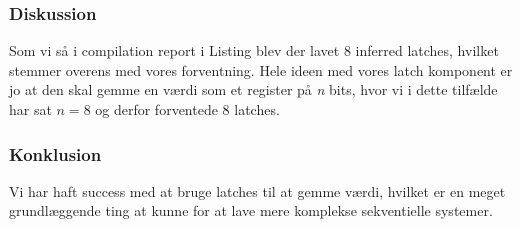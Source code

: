 {    %
    \subsubsection{Diskussion}

    Som vi så i compilation report i Listing  blev der lavet 8 inferred latches, hvilket stemmer overens med vores forventning. Hele ideen med vores latch komponent er jo at den skal gemme en værdi som et register på \emph{n} bits, hvor vi i dette tilfælde har sat \(n = 8\) og derfor forventede 8 latches.

    \subsubsection{Konklusion}

    Vi har haft success med at bruge latches til at gemme værdi, hvilket er en meget grundlæggende ting at kunne for at lave mere komplekse sekventielle systemer.
}
